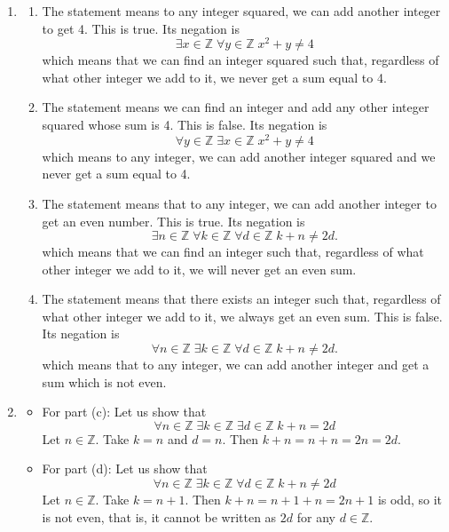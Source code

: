 \documentclass{article}
\newcommand{\Z}{\mathbb{Z}}
\theoremstyle{definition}
\begin{document}
\begin{solution}
\begin{enumerate}
	\item 
	\begin{enumerate}
		\item The statement means to any integer squared, we can add another integer to get 4. This is true. Its negation is
		\[
		\exists x \in \Z \; \forall y \in \Z \; x^2 + y \neq 4
		\]
		which means that we can find an integer squared such that, regardless of what other integer we add to it, we never get a sum equal to 4. 
		
		\item The statement means we can find an integer and add any other integer squared whose sum is 4. This is false. Its negation is
		\[
		\forall y \in \Z \; \exists x \in \Z \; x^2 + y \neq 4
		\]
		which means to any integer, we can add another integer squared and we never get a sum equal to 4.
		
		
		\item The statement means that to any integer, we can add another integer to get an even number. This is true. Its negation is
		\[
		\exists n \in \Z \; \forall k \in \Z \; \forall d \in \Z \; k + n \neq 2d.
		\]
		which means that we can find an integer such that, regardless of what other integer we add to it, we will never get an  even sum.
		
		\item The statement means that there exists an integer such that, regardless of what other integer we add to it, we always get an even sum. This is false. Its negation is
		\[
		\forall n \in \Z \; \exists k \in \Z \; \forall d \in \Z \; k + n \neq 2d.
		\]
		which means that to any integer, we can add another integer and get a sum which is not even.
		
	\end{enumerate}
	\item \begin{itemize}
		\item For part (c): Let us show that
		\[
		\forall n \in \Z \; \exists k \in \Z \; \exists d \in \Z \; k + n = 2d
		\]
		Let $n \in \Z$. Take $k = n$ and $d = n$. Then $k+n = n + n = 2n = 2d$.
		
		\item For part (d): Let us show that
		\[
		\forall n \in \Z \; \exists k \in \Z \; \forall d \in \Z \; k + n \neq 2d
		\]
		Let $n \in \Z$. Take $k = n + 1$. Then $k + n = n+1+n = 2n + 1$ is odd, so it is not even, that is, it cannot be written as $2d$ for any $d \in \Z$.
		
	\end{itemize}
	
\end{enumerate}

\end{solution}
\end{document}
